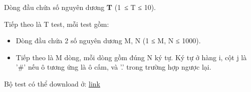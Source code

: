 Dòng đầu chứa số nguyên dương   \textbf{    T   }   (1 ≤ T ≤ 10).  

   Tiếp theo là T test, mỗi test gồm:  
\begin{itemize}
	\item     Dòng đầu chứa 2 số nguyên dương M, N (1 ≤ M, N ≤ 1000).   
	\item     Tiếp theo là M dòng, mỗi dòng gồm đúng N ký tự. Ký tự ở hàng i, cột j là '\#' nếu ô tương ứng là ô cấm, và '.' trong trường hợp ngược lại.   
\end{itemize}

   Bộ test có thể download ở:   \href{../../../content/voj:VMTILE}{    link   }